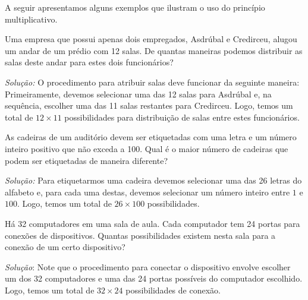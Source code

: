 A seguir apresentamos alguns exemplos que ilustram o uso do princípio
multiplicativo.

\begin{Example}
Uma empresa que possui apenas dois empregados, Asdrúbal e Credirceu,
alugou um andar de um prédio com 12 salas. De quantas maneiras podemos
distribuir as salas deste andar para estes dois funcionários?

\textit{Solução:} O procedimento para atribuir salas deve funcionar da
seguinte maneira: Primeiramente, devemos selecionar uma das 12 salas para
Asdrúbal e, na sequência, escolher uma das 11 salas restantes para
Credirceu. Logo, temos um total de $12 \times 11$ possibilidades para
distribuição de salas entre estes funcionários.
\end{Example}

\begin{Example}
As cadeiras de um auditório devem ser etiquetadas com uma letra e um
número inteiro positivo que não exceda a 100. Qual é o maior número
de cadeiras que podem ser etiquetadas de maneira diferente?

\textit{Solução:} Para etiquetarmos uma cadeira devemos selecionar uma
das 26 letras do alfabeto e, para cada uma destas, devemos selecionar
um número inteiro entre $1$ e $100$. Logo, temos um total de $26
\times 100$ possibilidades.
\end{Example}

\begin{Example}
Há 32 computadores em uma sala de aula. Cada computador tem 24
portas para conexões de dispositivos. Quantas possibilidades existem
nesta sala para a conexão de um certo dispositivo?

\textit{Solução}: Note que o procedimento para conectar o dispositivo
envolve escolher um dos 32 computadores e uma das 24 portas possíveis
do computador escolhido. Logo, temos um total de $32 \times 24$
possibilidades de conexão.
\end{Example}

